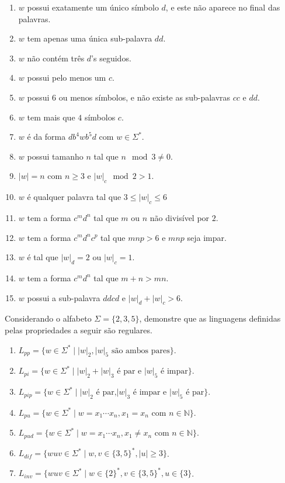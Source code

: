 \begin{enumerate}
	\item $w$ possui exatamente um único símbolo $d$, e este não aparece no final das palavras.
	\item $w$ tem apenas uma única sub-palavra $dd$.
	\item $w$ não contém três $d$'s seguidos.
	\item $w$ possui pelo menos um $c$.
	\item $w$ possui 6 ou menos símbolos, e não existe as sub-palavras $cc$ e $dd$.
	\item $w$ tem mais que $4$ símbolos $c$.
	\item $w$ é da forma $db^4wb^5d$ com $w \in \Sigma^*$.
	\item $w$ possui tamanho $n$ tal que $n \mod 3 \neq 0$.
	\item $|w| = n$ com $n \geq 3$ e $|w|_c \mod 2 > 1$.
	\item $w$ é qualquer palavra tal que $3 \leq |w|_c \leq 6$
	\item $w$ tem a forma $c^md^n$ tal que $m$ ou $n$ não divisível por $2$.
	\item $w$ tem a forma $c^md^nc^p$ tal que $mnp > 6$ e $mnp$ seja impar.
	\item $w$ é tal que $|w|_d = 2$ ou $|w|_c = 1$.
	\item $w$ tem a forma $c^md^n$ tal que $m+n > mn$.
	\item $w$ possui a sub-palavra  $ddcd$ e $|w|_d + |w|_c > 6$.
\end{enumerate}

\begin{exercise}\label{exerc:LR11}
	Considerando o alfabeto $\Sigma = \{2, 3, 5\}$, demonstre que as linguagens definidas pelas propriedades a seguir são regulares.
\end{exercise}

\begin{enumerate}
	\item $L_{pp} = \{w \in \Sigma^* \mid |w|_2, |w|_5 \text{ são ambos pares}\}$.
	\item $L_{pi} = \{w \in \Sigma^* \mid |w|_2 + |w|_3 \text{ é par e } |w|_5 \text{ é impar}\}$.
	\item $L_{pip} = \{w \in \Sigma^* \mid |w|_2 \text{ é par,} |w|_3 \text{ é impar e } |w|_5 \text{ é par}\}$.
	\item $L_{pu} = \{w \in \Sigma^* \mid w = x_1\cdots x_n, x_1 = x_n \text{ com } n \in \mathbb{N}\}$.
	\item $L_{pud} = \{w \in \Sigma^* \mid w = x_1\cdots x_n, x_1 \neq x_n \text{ com } n \in \mathbb{N}\}$.
	\item $L_{dif} = \{wuv \in \Sigma^* \mid w,v \in \{3,5\}^*, |u| \geq 3\}$.
	\item $L_{inv} = \{wuv \in \Sigma^* \mid w \in \{2\}^*,v \in \{3,5\}^*, u \in \{3\}$.
\end{enumerate}
